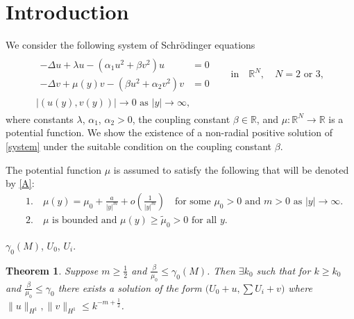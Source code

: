 \documentclass[a4paper,11pt]{article}
\def\blue{\color{blue}}
\def\blue{\color{blue}}
\newtheorem{theorem}{Theorem}
\numberwithin{step}{dummy}
\begin{document}
\section{Introduction} \label{sec:intro}

\newpage

We consider the following system of Schr\"odinger equations 
\begin{align}\label{system}
 \begin{aligned}
 \begin{aligned}
 -\Delta u + \lambda u - \left(\alpha_1 u^2 + \beta v^2\right) u&= 0 \\
 -\Delta v + \mu(y) v - \left(\beta u^2 + \alpha_2 v^2\right) v&= 0
 \end{aligned} \quad &\text{in} \quad \mathbb{R}^N, \quad \text{$N=2$ or $3$},\\
 \text{$\big|(u(y),v(y))\big| \rightarrow 0$ as $|y| \rightarrow \infty$},&
 \end{aligned}
\end{align}
where constants $\lambda$, $\alpha_1$, $\alpha_2>0$, the coupling constant $\beta \in \mathbb{R}$, and $\mu: \mathbb{R}^N \rightarrow \mathbb{R}$ is a potential function. We show the existence of a non-radial {\blue positive} solution of \eqref{system} under the suitable condition on the coupling constant $\beta$. 

The potential function $\mu$ is assumed to satisfy the following that will be denoted by \eqref{A}:
\begin{equation}\tag{$A$}\label{A}
 \begin{aligned}
  &1. \quad \mu(y) = \mu_0 + \frac{a}{|y|^m} + o\left(\frac{1}{|y|^m}\right) \quad \text{for some $\mu_0>0$ and $m>0$ as $|y| \rightarrow \infty$.}\\
  &2. \quad \text{$\mu$ is bounded and $\mu(y)\ge \tilde{\mu}_0 > 0$ for all $y$.}
 \end{aligned}
\end{equation}

{\blue $\gamma_0(M)$, $U_0$, $U_i$.}


\begin{theorem} Suppose $m \ge \frac{1}{2}$ and $\frac{\beta}{\mu_0} \le \gamma_0(M)$. Then $\exists k_0$ such that for $k\ge k_0$ and $\frac{\beta}{\mu_0} \le \gamma_0$ there exists a solution of the form $\big(U_0 +u, \sum U_i + v\big)$ where 
$ \|u\|_{H^1},  \|v\|_{H^1} \le k^{-m + \frac{1}{2}}$.
 
\end{theorem}
\end{document}
